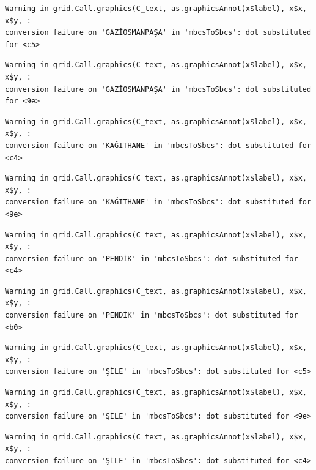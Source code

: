 \documentclass[
  11pt,
  a4paper,
  DIV=11,
  numbers=noendperiod]{scrartcl}
\begin{document}
\begin{verbatim}
Warning in grid.Call.graphics(C_text, as.graphicsAnnot(x$label), x$x, x$y, :
conversion failure on 'GAZİOSMANPAŞA' in 'mbcsToSbcs': dot substituted for <c5>
\end{verbatim}

\begin{verbatim}
Warning in grid.Call.graphics(C_text, as.graphicsAnnot(x$label), x$x, x$y, :
conversion failure on 'GAZİOSMANPAŞA' in 'mbcsToSbcs': dot substituted for <9e>
\end{verbatim}

\begin{verbatim}
Warning in grid.Call.graphics(C_text, as.graphicsAnnot(x$label), x$x, x$y, :
conversion failure on 'KAĞITHANE' in 'mbcsToSbcs': dot substituted for <c4>
\end{verbatim}

\begin{verbatim}
Warning in grid.Call.graphics(C_text, as.graphicsAnnot(x$label), x$x, x$y, :
conversion failure on 'KAĞITHANE' in 'mbcsToSbcs': dot substituted for <9e>
\end{verbatim}

\begin{verbatim}
Warning in grid.Call.graphics(C_text, as.graphicsAnnot(x$label), x$x, x$y, :
conversion failure on 'PENDİK' in 'mbcsToSbcs': dot substituted for <c4>
\end{verbatim}

\begin{verbatim}
Warning in grid.Call.graphics(C_text, as.graphicsAnnot(x$label), x$x, x$y, :
conversion failure on 'PENDİK' in 'mbcsToSbcs': dot substituted for <b0>
\end{verbatim}

\begin{verbatim}
Warning in grid.Call.graphics(C_text, as.graphicsAnnot(x$label), x$x, x$y, :
conversion failure on 'ŞİLE' in 'mbcsToSbcs': dot substituted for <c5>
\end{verbatim}

\begin{verbatim}
Warning in grid.Call.graphics(C_text, as.graphicsAnnot(x$label), x$x, x$y, :
conversion failure on 'ŞİLE' in 'mbcsToSbcs': dot substituted for <9e>
\end{verbatim}

\begin{verbatim}
Warning in grid.Call.graphics(C_text, as.graphicsAnnot(x$label), x$x, x$y, :
conversion failure on 'ŞİLE' in 'mbcsToSbcs': dot substituted for <c4>
\end{verbatim}
\end{document}
